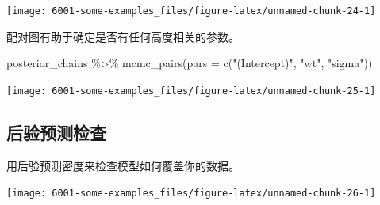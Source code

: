 \documentclass[
]{book}
\newenvironment{Shaded}{\begin{snugshade}}{\end{snugshade}}
\newcommand{\AttributeTok}[1]{\textcolor[rgb]{0.77,0.63,0.00}{#1}}
\newcommand{\DecValTok}[1]{\textcolor[rgb]{0.00,0.00,0.81}{#1}}
\newcommand{\FloatTok}[1]{\textcolor[rgb]{0.00,0.00,0.81}{#1}}
\newcommand{\FunctionTok}[1]{\textcolor[rgb]{0.00,0.00,0.00}{#1}}
\newcommand{\NormalTok}[1]{#1}
\newcommand{\OtherTok}[1]{\textcolor[rgb]{0.56,0.35,0.01}{#1}}
\newcommand{\SpecialCharTok}[1]{\textcolor[rgb]{0.00,0.00,0.00}{#1}}
\newcommand{\StringTok}[1]{\textcolor[rgb]{0.31,0.60,0.02}{#1}}
\begin{document}
\begin{center}\texttt{[image: 6001-some-examples\_files/figure-latex/unnamed-chunk-24-1]} \end{center}

配对图有助于确定是否有任何高度相关的参数。

\begin{Shaded}
\begin{Highlighting}[]
\NormalTok{posterior\_chains }\SpecialCharTok{\%\textgreater{}\%} \FunctionTok{mcmc\_pairs}\NormalTok{(}\AttributeTok{pars =} \FunctionTok{c}\NormalTok{(}\StringTok{"(Intercept)"}\NormalTok{, }\StringTok{"wt"}\NormalTok{, }\StringTok{"sigma"}\NormalTok{))}
\end{Highlighting}
\end{Shaded}

\begin{center}\texttt{[image: 6001-some-examples\_files/figure-latex/unnamed-chunk-25-1]} \end{center}

\hypertarget{ux540eux9a8cux9884ux6d4bux68c0ux67e5}{%
\subsection{后验预测检查}\label{ux540eux9a8cux9884ux6d4bux68c0ux67e5}}

用后验预测密度来检查模型如何覆盖你的数据。

\begin{Shaded}
\end{Shaded}

\begin{center}\texttt{[image: 6001-some-examples\_files/figure-latex/unnamed-chunk-26-1]} \end{center}
\end{document}
